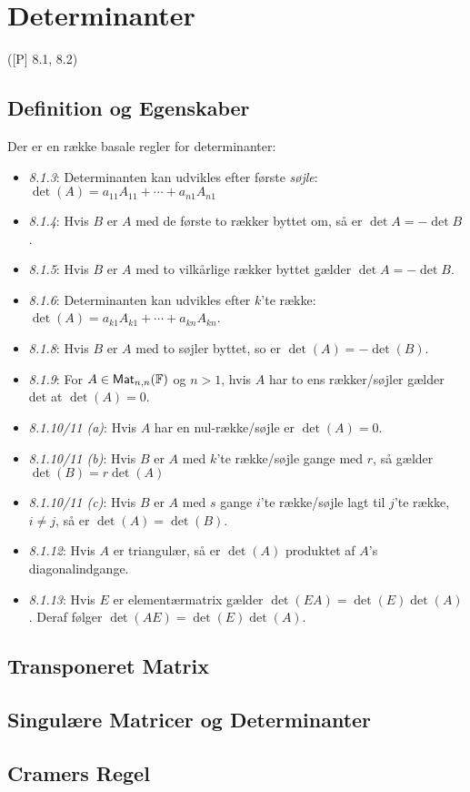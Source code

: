 \newpage
\chapter{Determinanter}
([P] 8.1, 8.2)

\section{Definition og Egenskaber}


\begin{bemaerk}
Der er en række basale regler for determinanter:
\begin{itemize}
	\item \emph{8.1.3}: Determinanten kan udvikles efter første \emph{søjle}:
		$\det(A) = a_{11}A_{11} + \dotsb + a_{n1}A_{n1}$
	\item \emph{8.1.4}: Hvis $B$ er $A$ med de første to rækker byttet om, så
		er $\det A = -\det B$.
	\item \emph{8.1.5}: Hvis $B$ er $A$ med to vilkårlige rækker byttet gælder
		$\det A = -\det B$.
	\item \emph{8.1.6}: Determinanten kan udvikles efter $k$'te række:
		$\det(A) = a_{k1}A_{k1}+\dotsb+a_{kn}A_{kn}$.
	\item \emph{8.1.8}: Hvis $B$ er $A$ med to søjler byttet, so er $\det(A)
		= -\det(B)$.
	\item \emph{8.1.9}: For $A\in\textsf{Mat}_{n,n}(\mathbb{F})$ og $n > 1$, hvis $A$
		har to ens rækker/søjler gælder det at $\det(A) = 0$.
	\item \emph{8.1.10/11 (a)}: Hvis $A$ har en nul-række/søjle er $\det(A) =
		0$.
	\item \emph{8.1.10/11 (b)}: Hvis $B$ er $A$ med $k$'te række/søjle gange
		med $r$, så gælder $\det(B) = r\det(A)$
	\item \emph{8.1.10/11 (c)}: Hvis $B$ er $A$ med $s$ gange $i$'te
		række/søjle lagt til $j$'te række, $i \ne j$, så er $\det(A) =
		\det(B)$.
	\item \emph{8.1.12}: Hvis $A$ er triangulær, så er $\det(A)$ produktet af
		$A$'s diagonalindgange.
	\item \emph{8.1.13}: Hvis $E$ er elementærmatrix gælder $\det(EA) = \det(E)
		\det(A)$. Deraf følger $\det(AE) = \det(E)\det(A)$.
\end{itemize}
\end{bemaerk}

\section{Transponeret Matrix}


\section{Singulære Matricer og Determinanter}



\section{Cramers Regel}



